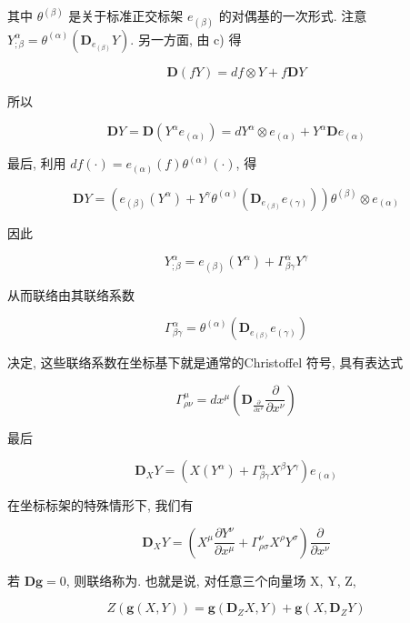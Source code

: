 其中 $\theta^{(\beta)}$ 是关于标准正交标架 $e_{(\beta)}$ 的对偶基的一次形式. 注意 $Y_{;\beta}^{\alpha} = \theta^{(\alpha)}(\mathbf{D}_{e_{(\beta)}}Y)$. 另一方面, 由 c) 得

\[
\mathbf{D}(fY) = df \otimes Y + f\mathbf{D}Y
\]

所以

\[
\mathbf{D}Y = \mathbf{D}(Y^{\alpha}e_{(\alpha)}) = dY^{\alpha} \otimes e_{(\alpha)} + Y^{\alpha}\mathbf{D}e_{(\alpha)}
\]

最后, 利用 $df(\cdot) = e_{(\alpha)}(f)\theta^{(\alpha)}(\cdot)$, 得

\begin{equation}
\mathbf{D}Y = \left(e_{(\beta)}(Y^{\alpha}) + Y^{\gamma}\theta^{(\alpha)}(\mathbf{D}_{e_{(\beta)}}e_{(\gamma)})\right)\theta^{(\beta)} \otimes e_{(\alpha)}\label{eq:cA-406}
\end{equation}

因此

\[
Y^{\alpha}_{;\beta} = e_{(\beta)}(Y^{\alpha}) + \Gamma^{\alpha}_{\beta\gamma}Y^{\gamma}
\]

从而联络由其联络系数

\begin{equation}
\Gamma^{\alpha}_{\beta\gamma} = \theta^{(\alpha)}(\mathbf{D}_{e_{(\beta)}}e_{(\gamma)})\label{eq:cA-407}
\end{equation}

决定, 这些联络系数在坐标基下就是通常的Christoffel 符号, 具有表达式

\[
\Gamma^{\mu}_{\rho\nu} = dx^{\mu}\left(\mathbf{D}_{\frac{\partial}{\partial x^{\rho}}}\frac{\partial}{\partial x^{\nu}}\right)
\]

最后

\begin{equation}
\mathbf{D}_{X}Y = \left(X(Y^{\alpha}) + \Gamma^{\alpha}_{\beta\gamma}X^{\beta}Y^{\gamma}\right)e_{(\alpha)}\label{eq:cA-408}
\end{equation}

在坐标标架的特殊情形下, 我们有

\[
\mathbf{D}_{X}Y = \left(X^{\mu}\frac{\partial Y^{\nu}}{\partial x^{\mu}} + \Gamma^{\nu}_{\rho\sigma}X^{\rho}Y^{\sigma}\right)\frac{\partial}{\partial x^{\nu}}
\]

若 $\mathbf{D}\mathbf{g} = 0$, 则联络称为. 也就是说, 对任意三个向量场 X, Y, Z,

\begin{equation}
Z(\mathbf{g}(X, Y)) = \mathbf{g}(\mathbf{D}_{Z}X, Y) + \mathbf{g}(X, \mathbf{D}_{Z}Y)\label{eq:cA-409}
\end{equation}

